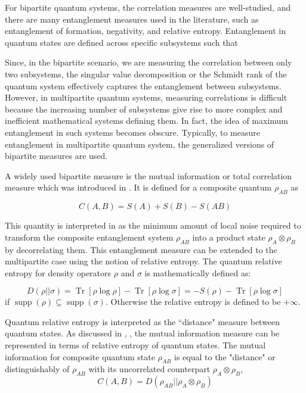 \documentclass{article}
\DeclareMathOperator{\Tr}{Tr}
\newcommand{\brackets}[1]{\left[ #1 \right]}
\newcommand{\trace}[1]{\Tr \brackets{ #1 }}
\DeclareMathOperator{\supp}{supp}
\begin{document}
For bipartite quantum systems, the correlation measures are well-studied, and there are many entanglement measures used in the literature, such as entanglement of formation, negativity, and relative entropy. Entanglement in quantum states are defined across specific subsystems such that 

Since, in the bipartite scenario, we are measuring the correlation between only two subsystems, the singular value decomposition or the Schmidt rank of the quantum system effectively captures the entanglement between subsystems. However, in multipartite quantum systems, measuring correlations is difficult because the increasing number of subsystems give rise to more complex and inefficient mathematical systems defining them. In fact, the idea of maximum entanglement in such systems becomes obscure. Typically, to measure entanglement in multipartite quantum system, the generalized versions of bipartite measures are used.

A widely used bipartite measure is the mutual information or total correlation measure which was introduced in \cite{cerf1998information}. It is defined for a composite quantum $\rho_{AB}$ as 

\begin{equation}
\label{eq:total_correlation_bipartite}
C(A, B) = S(A) + S(B) - S(AB)
\end{equation}

This quantity is interpreted in \cite{wintercorrelations} as the minimum amount of local noise required to transform the composite entanglement system $\rho_{AB}$ into a product state $\rho_A \otimes \rho_B$ by decorrelating them. This entanglement measure can be extended to the multipartite case using the notion of relative entropy. The quantum relative entropy for density operators $\rho$ and $\sigma$ is mathematically defined as:

\begin{equation}
\label{eq:relative_entropy}
D(\rho || \sigma) = \trace{\rho \log \rho} - \trace{\rho \log \sigma} = -S(\rho) - \trace{\rho \log \sigma} 
\end{equation}
if $\supp(\rho) \subseteq \supp(\sigma)$. Otherwise the relative entropy is defined to be $+ \infty$.

Quantum relative entropy is interpreted as the ``distance" measure between quantum states. As discussed in \cite{vderal1998relativeentropy}, \cite{vedral2002relativeentropy} , the mutual information measure can be represented in terms of relative entropy of quantum states. The mutual information for composite quantum state $\rho_{AB}$ is equal to the "distance" or distinguishably of $\rho_{AB}$ with its uncorrelated counterpart $\rho_A \otimes \rho_B$, 
\begin{equation}
\label{eq:equality_of_RE_total_correlation}
    C(A, B) = D(\rho_{AB} || \rho_A \otimes \rho_B)
\end{equation}
\end{document}
